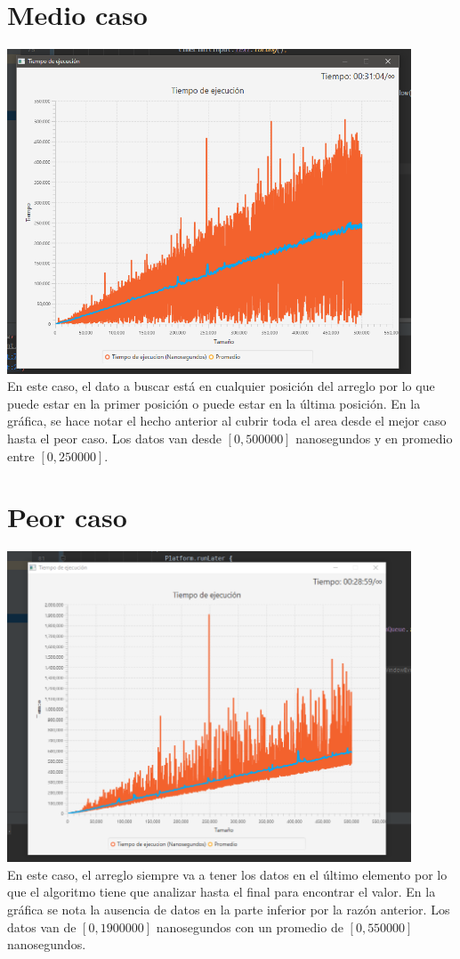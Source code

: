 \documentclass{article}
\begin{document}
\section{Medio caso}
\includegraphics[width=12cm]{medio.png}\\
En este caso, el dato a buscar está en cualquier posición del arreglo por lo que puede estar en la primer posición o puede estar en la última posición. 
En la gráfica, se hace notar el hecho anterior al cubrir toda el area desde el mejor caso hasta el peor caso. Los datos van desde $[0,500000]$ nanosegundos y en promedio entre $[0,250000]$.
\maketitle
\section{Peor caso}
\includegraphics[width=12cm]{peor.png}\\
En este caso, el arreglo siempre va a tener los datos en el último elemento por lo que el algoritmo tiene que analizar hasta el final para encontrar el valor. 
En la gráfica se nota la ausencia de datos en la parte inferior por la razón anterior. Los datos van de $[0, 1900000]$ nanosegundos con un promedio de $[0, 550000]$ nanosegundos.
\end{document}

